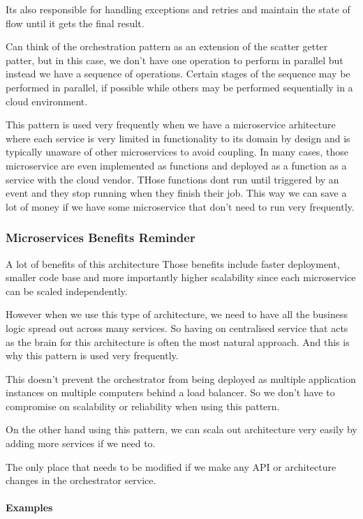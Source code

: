 Its also responsible for handling exceptions and retries and maintain the state of flow until it gets the final result.

Can think of the orchestration pattern as an extension of the scatter getter patter, but in this case, we don't have one operation to perform in parallel but instead we have a sequence of operations.
Certain stages of the sequence may be performed in parallel, if possible while others may be performed sequentially in a cloud environment.

This pattern is used very frequently when we have a microservice arhitecture where each service is very limited in functionality to its domain by design and is typically unaware of other microservices to avoid coupling.
In many cases, those microservice are even implemented as functions and deployed as a function as a service with the cloud vendor.
THose functions dont run until triggered by an event and they stop running when they finish their job.
This way we can save a lot of money if we have some microservice that don't need to run very frequently.

\subsubsection{Microservices Benefits Reminder}
A lot of benefits of this architecture
Those benefits include faster deployment, smaller code base and more importantly higher scalability since each microservice can be scaled independently.

However when we use this type of architecture, we need to have all the business logic spread out across many services.
So having on centralised service that acts as the brain for this architecture is often the most natural approach.
And this is why this pattern is used very frequently.

This doesn't prevent the orchestrator from being deployed as multiple application instances on multiple computers behind a load balancer.
So we don't have to compromise on scalability or reliability when using this pattern.

On the other hand using this pattern, we can scala out architecture very easily by adding more services if we need to.

The only place that needs to be modified if we make any API or architecture changes in the orchestrator service.

\paragraph{Examples}

